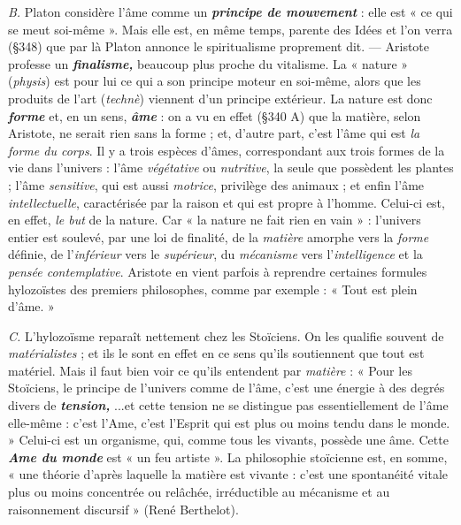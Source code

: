 {\it B.} Platon considère l’âme comme un \textbf{\textit {principe de mouvement}} :
elle est « ce qui se meut soi-même ». Mais elle est, en même temps,
parente des Idées et l’on verra (\S 348) que par là Platon annonce le
spiritualisme proprement dit. — Aristote professe un \textbf{\textit {finalisme,}}
beaucoup plus proche du vitalisme. La « nature » ({\it physis}) est pour lui
ce qui a son principe moteur en soi-même, alors que les produits de
l'art ({\it technè}) viennent d’un principe extérieur. La nature est donc
\textbf{\textit {forme}} et, en un sens, \textbf{\textit {âme}} :
on a vu en effet (\S 340 A) que la matière,
selon Aristote, ne serait rien sans la forme ; et, d’autre part, c’est
l’âme qui est {\it la forme du corps}. Il y a trois espèces d’âmes, correspondant
aux trois formes de la vie dans l’univers : l’âme {\it végétative} ou
{\it nutritive}, la seule que possèdent les plantes ; l'âme {\it sensitive}, qui est aussi
{\it motrice}, privilège des animaux ; et enfin l’âme {\it intellectuelle}, caractérisée
par la raison et qui est propre à l’homme. Celui-ci est, en effet,
{\it le but} de la nature. Car « la nature ne fait rien en vain » : l’univers
entier est soulevé, par une loi de finalité, de la {\it matière} amorphe vers
la {\it forme} définie, de l’{\it inférieur} vers le {\it supérieur}, du {\it mécanisme} vers
l'{\it intelligence} et la {\it pensée contemplative}. Aristote en vient parfois à
reprendre certaines formules hylozoïstes des premiers philosophes,
comme par exemple : « Tout est plein d'âme. »

{\it C.} L'hylozoïsme reparaît nettement chez les Stoïciens. On les
qualifie souvent de {\it matérialistes} ; et ils le sont en effet en ce sens qu’ils
soutiennent que tout est matériel. Mais il faut bien voir ce qu'ils
entendent par {\it matière} : « Pour les Stoïciens, le principe de l’univers
comme de l’âme, c’est une énergie à des degrés divers de \textbf{\textit {tension,}} ...et
cette tension ne se distingue pas essentiellement de l’âme elle-même :
c’est l’Ame, c’est l'Esprit qui est plus ou moins tendu dans le monde. »
Celui-ci est un organisme, qui, comme tous les vivants, possède une
âme. Cette \textbf{\textit {Ame du monde}} est « un feu artiste ». La philosophie
stoïcienne est, en somme, « une théorie d’après laquelle la matière est
vivante : c’est une spontanéité vitale plus ou moins concentrée ou
relâchée, irréductible au mécanisme et au raisonnement discursif »
(René Berthelot).

